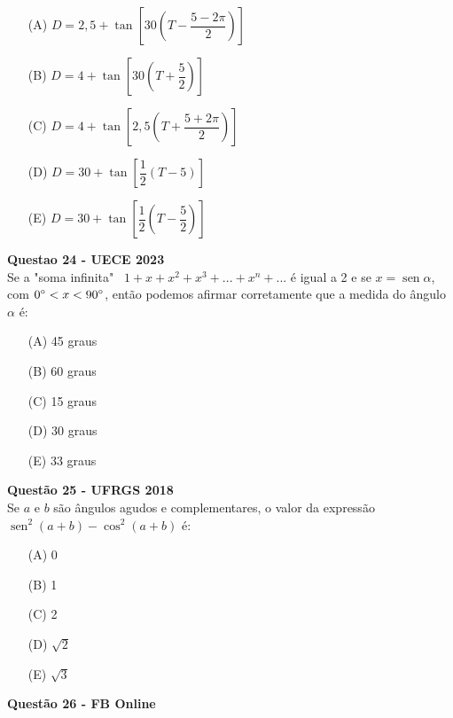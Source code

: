 \documentclass[12pt]{article}
\newcommand{\sen}{\operatorname{sen}}
\newcommand{\vermelho}[1]{{\color{red}#1}}
\begin{document}
\begin{multicols}{2}
	\begin{itemize}
		\item[(A)] $D=2,5+\tan \left[ 30\left( T - \dfrac{5-2\pi}{2} \right) \right] $\\
		\item[(B)] $D=4+\tan \left[ 30\left( T + \dfrac{5}{2} \right) \right] $\\
		\item[(C)] $D=4+\tan \left[ 2,5\left( T + \dfrac{5+2\pi}{2} \right) \right] $\\
		\item[(D)] $D=30+\tan \left[\dfrac{1}{2}\left( T -5 \right) \right] $\\
		\item[(E)] \vermelho{$D=30+\tan \left[\dfrac{1}{2}\left( T - \dfrac{5}{2} \right) \right] $\\} %
	\end{itemize}
	
\textbf{Questao 24 - UECE 2023} \\
	
	Se a "soma infinita" \ $1+x+x^{2}+x^{3}+...+x^{n}+...$ é igual a 2 e se $x=\sen \alpha$, com $0\degree < x < 90\degree$, então podemos afirmar corretamente que a medida do ângulo $\alpha$ é: 
	
	\begin{itemize}
		\item[(A)] 45 graus
		\item[(B)] 60 graus
		\item[(C)] 15 graus
		\item[(D)] \vermelho{30 graus} %
		\item[(E)] 33 graus
	\end{itemize}
	
\textbf{Questão 25 - UFRGS 2018} \\

	Se $a$ e $b$ são ângulos agudos e complementares, o valor da expressão $\sen^{2}\left(a+b \right) - \cos^{2}\left( a+b \right) $ é:
	
	\begin{itemize}
		\item[(A)] 0
		\item[(B)] \vermelho{1} %
		\item[(C)] 2
		\item[(D)] $\sqrt{2}$
		\item[(E)] $\sqrt{3}$
	\end{itemize}
	
\textbf{Questão 26 - FB Online}


\end{multicols}
\end{document}
